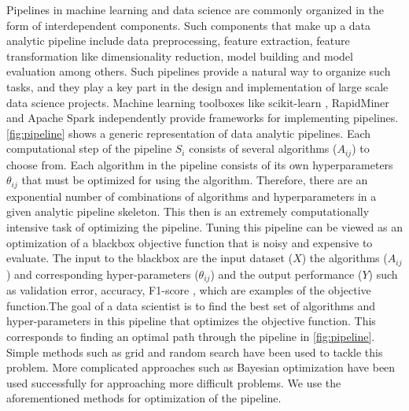 Pipelines in machine learning and data science are commonly organized in the form of interdependent components. Such components that make up a data analytic pipeline include data preprocessing, feature extraction, feature transformation like dimensionality reduction, model building and model evaluation among others. Such pipelines provide a natural way to organize such tasks, and they play a key part in the design and implementation of large scale data science projects. Machine learning toolboxes like scikit-learn \cite{pedregosa2011scikit}, RapidMiner \cite{mierswa2006yale} and Apache Spark \cite{spark2016apache} independently provide frameworks for implementing pipelines. \ref{fig:pipeline} shows a generic representation of data analytic pipelines. Each computational step of the pipeline $S_{i}$ consists of several algorithms ($A_{ij}$) to choose from. Each algorithm in the pipeline consists of its own hyperparameters $\theta_{ij}$ that must be optimized for using the algorithm. Therefore, there are an exponential number of combinations of algorithms and hyperparameters in a given analytic pipeline skeleton. This then is an extremely computationally intensive task of optimizing the pipeline. Tuning this pipeline can be viewed as an optimization of a blackbox objective function that is noisy and expensive to evaluate. The input to the blackbox are the input dataset ($X$) the algorithms ($A_{ij}$) and corresponding hyper-parameters ($\theta_{ij}$) and the output performance ($Y$) such as validation error, accuracy, F1-score , which are examples of the objective function.The goal of a data scientist is to find the best set of algorithms and hyper-parameters in this pipeline that optimizes the objective function. This corresponds to finding an optimal path through the pipeline in \ref{fig:pipeline}.  Simple methods such as grid and random search \cite{bergstra2012random} have been used to tackle this problem. More complicated approaches such as Bayesian optimization \cite{snoek2012practical} have been used successfully for approaching more difficult problems. We use the aforementioned methods for optimization of the pipeline.  


